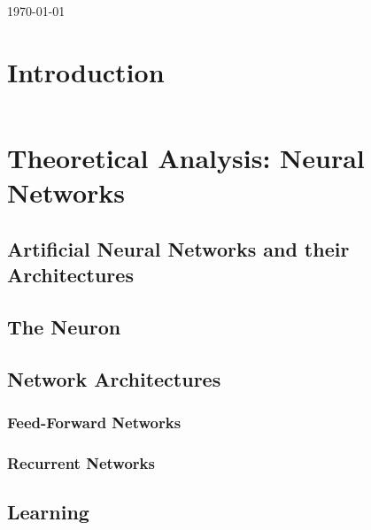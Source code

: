 \documentclass[11pt]{article}
\begin{document}
\begin{titlepage}
{\large \today}\\[3cm] 


 

\vfill 

\end{titlepage}

\tableofcontents
\newpage
\newpage

\section{Introduction}
$ $ \indent 

\section{Theoretical Analysis: Neural Networks}
\subsection{Artificial Neural Networks and their Architectures}

\subsection{The Neuron}


\subsection{Network Architectures}

\subsubsection{Feed-Forward Networks}

\subsubsection{Recurrent Networks}

\subsection{Learning}
 
\end{document}
